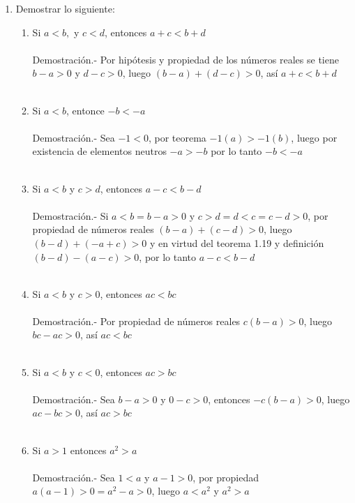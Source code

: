 \begin{enumerate}[\bfseries 1.]
\item Demostrar lo siguiente:
\begin{enumerate}[\bfseries i)]
\item Si $a<b,$ y $c<d$, entonces $a+c<b+d$\\\\
Demostración.- \; Por hipótesis y propiedad de los números reales se tiene $b-a>0$ y $d-c>0$, luego $(b-a)+(d-c)>0$, así $a+c<b+d$\\\\

\item Si $a<b$, entonce $-b<-a$\\\\
Demostración.- \; Sea $-1<0$, por teorema  \; $-1(a)>-1(b)$, luego por existencia de elementos neutros $-a>-b$ por lo tanto $-b<-a$\\\\

\item Si $a<b$ y $c>d$, entonces $a-c<b-d$\\\\
Demostración.- \;
Si $a<b = b-a>0$ \; y  \; $c>d=d<c=c-d>0$, por propiedad de números reales \; $(b-a)+(c-d)>0$, luego $(b-d)+(-a+c)>0$ y en virtud del teorema 1.19 y definición \; $(b-d)-(a-c)>0$, por lo tanto $a-c<b-d$\\\\

\item Si $a<b$ y $c>0$, entonces $ac<bc$\\\\
Demostración.- \; Por propiedad de números reales $c(b-a)>0$, luego $bc-ac>0$, así $ac<bc$\\\\

\item Si $a<b$ y $c<0$, entonces $ac>bc$\\\\
Demostración.- \; Sea $b-a>0$ y $0-c>0$, entonces $-c(b-a)>0$, luego $ac - bc >0$, así $ac>bc$\\\\

\item Si $a>1$ entonces $a^2>a$\\\\
Demostración.- \; Sea $1<a$ y $a-1>0$, por propiedad $a(a-1)>0=a^2-a>0$, luego $a<a^2$ y $a^2>a$\\\\


\end{enumerate}
\end{enumerate}
